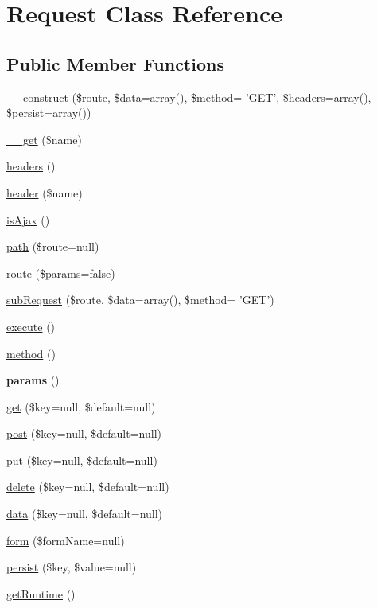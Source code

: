 \hypertarget{classRequest}{
\section{Request Class Reference}
\label{classRequest}
}
\subsection*{Public Member Functions}
\begin{DoxyCompactItemize}
\item 
\hyperlink{classRequest_af7216dd02f55fac9786612a098c6195e}{\_\-\_\-construct} (\$route, \$data=array(), \$method= 'GET', \$headers=array(), \$persist=array())
\item 
\hyperlink{classRequest_ad14cb0c1c2913fc4d86a19bfd4383dbc}{\_\-\_\-get} (\$name)
\item 
\hyperlink{classRequest_a30b1590321b7e93b6894e0ec557e46d5}{headers} ()
\item 
\hyperlink{classRequest_ac7de8477459542e9ff545cd292b7914e}{header} (\$name)
\item 
\hyperlink{classRequest_a5057f0fabb69a4c19af6e218b7b9bb7d}{isAjax} ()
\item 
\hyperlink{classRequest_aa97ca0a4c1ab78c7595a82fc8b2ec57f}{path} (\$route=null)
\item 
\hyperlink{classRequest_aeaba1ad044124a11cd68866603ce1fef}{route} (\$params=false)
\item 
\hyperlink{classRequest_a18ea75feddb5285b8097a52c78f17b2d}{subRequest} (\$route, \$data=array(), \$method= 'GET')
\item 
\hyperlink{classRequest_a7eafeed4dd7521aa654f70663d663dcf}{execute} ()
\item 
\hyperlink{classRequest_aac8d4b96b9b900a7edf41ca657ea0b6d}{method} ()
\item 
\hypertarget{classRequest_a67c4deda799d1c1d4839ed4f7830fa55}{
{\bfseries params} ()}
\label{classRequest_a67c4deda799d1c1d4839ed4f7830fa55}

\item 
\hyperlink{classRequest_a07e525938b1a92175ffe01808e070ec8}{get} (\$key=null, \$default=null)
\item 
\hyperlink{classRequest_a5439c158517f97674d201dcfe5dad11d}{post} (\$key=null, \$default=null)
\item 
\hyperlink{classRequest_af523fe9032ce728bcb27156eae258c0d}{put} (\$key=null, \$default=null)
\item 
\hyperlink{classRequest_a4a342ba4c5656bb467e43605287a8e2a}{delete} (\$key=null, \$default=null)
\item 
\hyperlink{classRequest_ac6dea526aea1f35a9f939b4b768397d8}{data} (\$key=null, \$default=null)
\item 
\hyperlink{classRequest_aa906be06b4d1c1d722727efc04d300e7}{form} (\$formName=null)
\item 
\hyperlink{classRequest_a096cae394f50b2f9be98354272c2c32e}{persist} (\$key, \$value=null)
\item 
\hyperlink{classRequest_a134ffcd200dcc73daf24b378ca056ba7}{getRuntime} ()
\end{DoxyCompactItemize}
